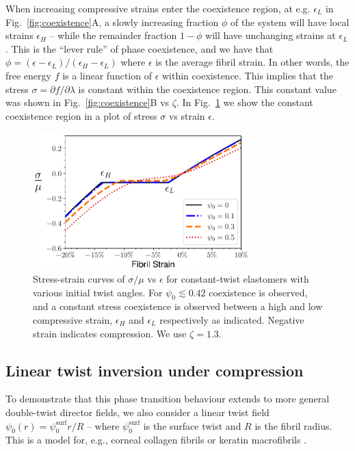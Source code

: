 \documentclass[twoside,twocolumn,9pt]{article}
\begin{document}
When increasing compressive strains enter the coexistence region, at e.g. $\epsilon_L$ in Fig.~\ref{fig:coexistence}A, a slowly increasing fraction $\phi$ of the system will have local strains $\epsilon_H$ -- while the remainder fraction $1-\phi$ will have unchanging strains at $\epsilon_L$. This is the ``lever rule'' of phase coexistence, and we have that $\phi = (\epsilon-\epsilon_L)/(\epsilon_H-\epsilon_L)$ where $\epsilon$ is the average fibril strain. In other words, the free energy $f$ is a linear function of $\epsilon$ within coexistence. This implies that the stress $\sigma = \partial f /\partial \lambda$ is constant within the coexistence region. This constant value was shown in Fig.~\ref{fig:coexistence}B vs $\zeta$. In Fig.~\ref{fig:pvstate} we show the constant coexistence region in a plot of stress $\sigma$ vs strain $\epsilon$. 

\begin{figure}[t!] %
\centering
   \includegraphics[width=8.3cm]{Figure_3.pdf}
  \caption{Stress-strain curves of $\sigma/\mu$ vs $\epsilon$ for constant-twist elastomers with various initial twist angles. For $\psi_0 \lesssim 0.42$ coexistence is observed, and a constant stress coexistence is observed between a high and low compressive strain, $\epsilon_H$ and $\epsilon_L$ respectively as indicated. Negative strain indicates compression. We use $\zeta=1.3$.}
  \label{fig:pvstate}
\end{figure}

\subsection{Linear twist inversion under compression}
To demonstrate that this phase transition behaviour extends to more general double-twist director fields, we also consider a linear twist field $\psi_0(r) = \psi_0^\text{surf} r/R$ -- where $\psi_0^\text{surf}$ is the surface twist and $R$ is the fibril radius. This is a model for, e.g.,  corneal collagen fibrils \cite{Cameron:2020, Leighton:2021a} or keratin macrofibrils \cite{Bryson:2009, Harland:2011}.
\end{document}
